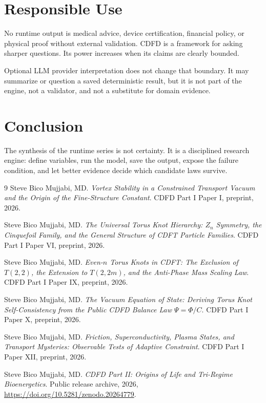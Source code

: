 \documentclass[12pt,a4paper]{article}
\begin{document}
\section{Responsible Use}
No runtime output is medical advice, device certification,
financial policy, or physical proof without external validation. CDFD is a
framework for asking sharper questions. Its power increases when its claims are
clearly bounded.

Optional LLM provider interpretation does not change that boundary. It may
summarize or question a saved deterministic result, but it is not part of the
engine, not a validator, and not a substitute for domain evidence.

\section{Conclusion}
The synthesis of the runtime series is not certainty. It is a disciplined
research engine: define variables, run the model, save the output, expose the
failure condition, and let better evidence decide which candidate laws survive.
\begin{thebibliography}{9}
Steve Bico Mujjabi, MD. \emph{Vortex Stability in a Constrained Transport Vacuum and the Origin of the Fine-Structure Constant}. CDFD Part I Paper I, preprint, 2026.

Steve Bico Mujjabi, MD. \emph{The Universal Torus Knot Hierarchy: $Z_n$ Symmetry, the Cinquefoil Family, and the General Structure of CDFT Particle Families}. CDFD Part I Paper VI, preprint, 2026.

Steve Bico Mujjabi, MD. \emph{Even-$n$ Torus Knots in CDFT: The Exclusion of $T(2,2)$, the Extension to $T(2,2m)$, and the Anti-Phase Mass Scaling Law}. CDFD Part I Paper IX, preprint, 2026.

Steve Bico Mujjabi, MD. \emph{The Vacuum Equation of State: Deriving Torus Knot Self-Consistency from the Public CDFD Balance Law $\Psi = \Phi/C$}. CDFD Part I Paper X, preprint, 2026.

Steve Bico Mujjabi, MD. \emph{Friction, Superconductivity, Plasma States, and Transport Mysteries: Observable Tests of Adaptive Constraint}. CDFD Part I Paper XII, preprint, 2026.

Steve Bico Mujjabi, MD. \emph{CDFD Part II: Origins of Life and Tri-Regime Bioenergetics}. Public release archive, 2026, \url{https://doi.org/10.5281/zenodo.20264779}.
\end{thebibliography}
\end{document}
